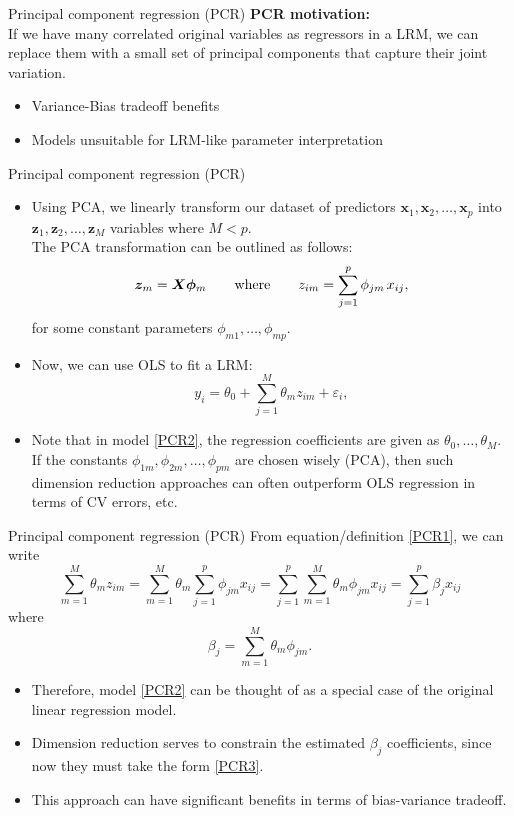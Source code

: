 \documentclass{beamer}
\begin{document}
\begin{frame}{Principal component regression (PCR)}
\textbf{PCR motivation:}\\
\bigskip
If we have many correlated original variables as regressors in a LRM, we can replace them with a small set of principal components that capture their joint variation.
\medskip
\begin{itemize}
\item Variance-Bias tradeoff benefits
\item Models unsuitable for LRM-like parameter interpretation
\end{itemize}
\end{frame}
\begin{frame}{Principal component regression (PCR)}
\begin{itemize}
\item Using PCA, we linearly transform our dataset of predictors $\bm{x}_1, \bm{x}_2, \dots, \bm{x}_p$ into $\bm{z}_1, \bm{z}_2, \dots, \bm{z}_M$ variables where $M < p$. \\The PCA transformation can be outlined as follows: 
\begin{equation} \label{PCR1}
\bm{z}_m = \bm{X\phi}_m \qquad \textnormal{where} \qquad z_{im} = \sum_{j=1}^p \phi_{jm\,} x_{ij},
\end{equation}
for some constant parameters $\phi_{m1}, \dots, \phi_{mp}$.
\item Now, we can use OLS to fit a LRM:
\begin{equation} \label{PCR2}
y_i = \theta_0 + \sum_{j=1}^M \theta_m z_{im} + \varepsilon_i,
\end{equation}
\item Note that in model \eqref{PCR2}, the regression coefficients are given
as $\theta_0, \dots, \theta_M$. If the constants $\phi_{1m}, \phi_{2m}, \dots , \phi_{pm}$ are chosen wisely (PCA), then such dimension reduction approaches can often
outperform OLS regression in terms of CV errors, etc.
\end{itemize}
\end{frame}
\begin{frame}{Principal component regression (PCR)}
From equation/definition \eqref{PCR1}, we can write
$$ \sum_{m=1}^M \theta_m z_{im} 
= \sum_{m=1}^M \theta_m \sum_{j=1}^p \phi_{jm} x_{ij} 
= \sum_{j=1}^p \sum_{m=1}^M \theta_m \phi_{jm} x_{ij} 
= \sum_{j=1}^p \beta_j x_{ij} 
$$ 
where 
\begin{equation} \label{PCR3}
\beta_j = \sum_{m=1}^M \theta_m \phi_{jm}.
\end{equation}
\begin{itemize}
\item Therefore, model \eqref{PCR2} can be thought of as a special case of the original linear regression model.
\item Dimension reduction serves to constrain the estimated $\beta_j$ coefficients, since now they must take the form \eqref{PCR3}.
\item This approach can have significant benefits in terms of bias-variance tradeoff.
\end{itemize}
\end{frame}
\end{document}
